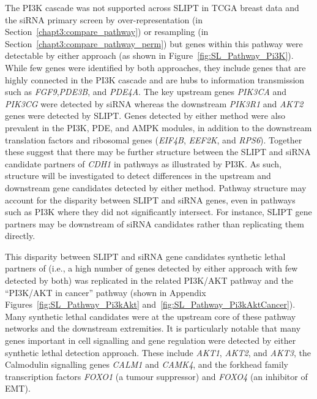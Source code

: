 The PI3K cascade was not supported across \gls{SLIPT} in \gls{TCGA} breast  data and the \gls{siRNA} primary screen by over-representation (in Section~\ref{chapt3:compare_pathway}) or resampling (in Section~\ref{chapt3:compare_pathway_perm}) but genes within this \gls{pathway} were detectable by either approach (as shown in Figure~\ref{fig:SL_Pathway_Pi3K}).  While few genes were identified by both approaches, they include genes that are highly connected in the PI3K cascade and are hubs to information transmission such as \textit{FGF9},\textit{PDE3B}, and \textit{PDE4A}. The key upstream genes \textit{PIK3CA} and \textit{PIK3CG} were detected by \gls{siRNA} whereas the downstream \textit{PIK3R1} and \textit{AKT2} genes were detected by \gls{SLIPT}. Genes detected by either method were also prevalent in the PI3K, PDE, and AMPK modules, in addition to the downstream translation factors and ribosomal genes (\textit{EIF4B}, \textit{EEF2K}, and \textit{RPS6}). Together these suggest that there may be further structure between the \gls{SLIPT} and \gls{siRNA} candidate partners of \textit{CDH1} in \glspl{pathway} as illustrated by PI3K. As such,  structure will be investigated to detect differences in the upstream and downstream gene candidates detected by either method. Pathway structure may account for the disparity between \gls{SLIPT} and \gls{siRNA} genes, even in \glspl{pathway} such as PI3K where they did not significantly intersect. For instance, \gls{SLIPT} gene partners may be downstream of \gls{siRNA} candidates rather than replicating them directly.

This disparity between \gls{SLIPT} and \gls{siRNA} gene candidates \gls{synthetic lethal} partners of  (i.e., a high number of genes detected by either approach with few detected by both) was replicated in the related PI3K/AKT \gls{pathway} and the ``PI3K/AKT in cancer'' \gls{pathway} (shown in Appendix Figures~\ref{fig:SL_Pathway_Pi3kAkt} and~\ref{fig:SL_Pathway_Pi3kAktCancer}). Many \gls{synthetic lethal} candidates were at the upstream core of these \gls{pathway} networks and the downstream extremities. It is particularly notable that many genes important in cell signalling and gene regulation were detected by either \gls{synthetic lethal} detection approach. These include \textit{AKT1}, \textit{AKT2}, and \textit{AKT3}, the Calmodulin signalling genes \textit{CALM1} and \textit{CAMK4}, and the forkhead family transcription factors \textit{FOXO1} (a \gls{tumour suppressor}) and \textit{FOXO4} (an inhibitor of \acrshort{EMT}).

